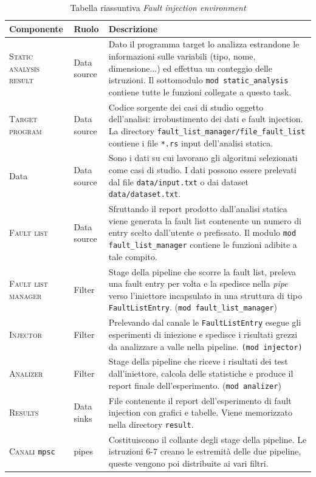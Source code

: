 \begin{table}[h] 
    \centering
    \small
    \begin{tabular}{p{4cm} p{2.5cm} p{8.5cm}}
        \toprule[1.5px]
        \textbf{\large Componente}&\textbf{\large Ruolo}&\textbf{\large Descrizione}\\
        \midrule[1.5px]
        \textsc{Static analysis result}&Data source&Dato il programma target lo analizza estrandone le informazioni sulle variabili (tipo, nome, dimensione...) ed  effettua un conteggio delle istruzioni. Il sottomodulo \texttt{mod static\_analysis} contiene tutte le funzioni collegate a questo task.\\
        \hline
        \textsc{Target program}&Data source&
            Codice sorgente dei casi di studio oggetto dell'analisi: irrobustimento dei dati e fault injection. La directory \texttt{fault\_list\_manager/file\_fault\_list} contiene i file \texttt{*.rs} input dell'analisi statica.\\
            \hline
            Data&Data source&Sono i dati su cui lavorano gli algoritmi selezionati come casi di studio. I dati possono essere prelevati dal file \texttt{data/input.txt} o dai dataset \texttt{data/dataset.txt}.\\
            \hline
        \textsc{Fault list}&Data source& Sfruttando il report prodotto dall'analisi statica viene generata la fault list contenente un numero di entry scelto dall'utente o prefissato. Il modulo \texttt{mod fault\_list\_manager} contiene le funzioni adibite a tale compito.\\
        \midrule
        \textsc{Fault list manager}&Filter&Stage della pipeline che scorre la fault list, preleva una fault entry per volta e la spedisce nella \textit{pipe} verso l'iniettore incapsulato in una struttura di tipo \texttt{FaultListEntry}. (\texttt{mod fault\_list\_manager})\\\hline
        \textsc{Injector}&Filter&Prelevando dal canale le \texttt{FaultListEntry} esegue gli esperimenti di iniezione e spedisce i risultati grezzi da analizzare a valle nella pipeline. \texttt{(mod injector)}\\\hline
        \textsc{Analizer}&Filter&Stage della pipeline che riceve i risultati dei test dall'iniettore, calcola delle statistiche e produce il report finale dell'esperimento. (\texttt{mod analizer})\\\hline
        \textsc{Results}&Data sinks&File contenente il report dell'esperimento di fault injection con grafici e tabelle. Viene memorizzato nella directory \texttt{result}.\\
        \midrule
        \textsc{Canali} \texttt{mpsc}&pipes&Costituiscono il collante degli stage della pipeline. Le istruzioni 6-7 creano le estremità delle due pipeline, queste vengono poi distribuite ai vari filtri.\\
        \bottomrule[1.5px]
   \end{tabular}
    \caption{Tabella riassuntiva \textit{Fault injection environment}}
    \label{setup}
\end{table}